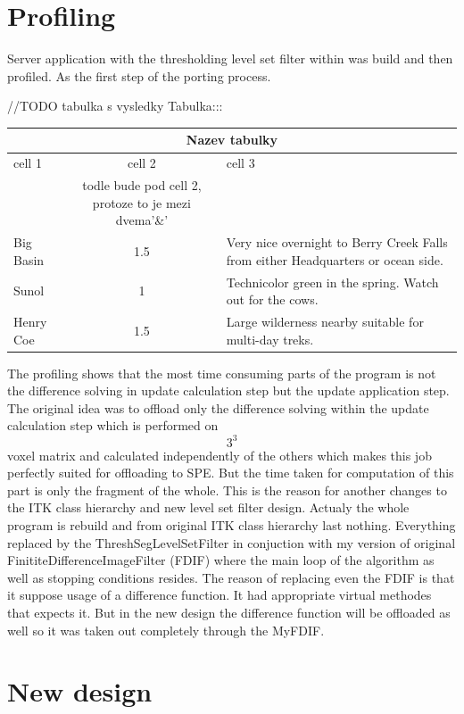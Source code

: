 \section{Profiling}

Server application with the thresholding level set filter within was build and then profiled. As the first step of the porting process.

//TODO tabulka s vysledky
Tabulka:::
\begin{center}
\begin{tabular}{|l|c|p{3.5in}|}
\hline
\multicolumn{3}{|c|}{Nazev tabulky}\\ 
\hline cell 1&cell 2&cell 3\\&todle bude pod cell 2, protoze to je mezi dvema'\&' &\\ 
\hline Big Basin&1.5&Very nice overnight to Berry Creek Falls from
either Headquarters or ocean side.\\ 
\hline Sunol&1&Technicolor green in the spring. Watch out for the cows.\\ 
\hline Henry Coe&1.5&Large wilderness nearby suitable for multi-day treks.\\ 
\hline
\end{tabular}
\end{center}

The profiling shows that the most time consuming parts of the program is not the difference solving in update calculation step but the update application step.
The original idea was to offload only the difference solving within the update calculation step which is performed on $$3^3$$ voxel matrix and calculated independently of the others which makes this job perfectly suited for offloading to SPE.
But the time taken for computation of this part is only the fragment of the whole.
This is the reason for another changes to the ITK class hierarchy and new level set filter design.
Actualy the whole program is rebuild and from original ITK class hierarchy last nothing.
Everything replaced by the ThreshSegLevelSetFilter in conjuction with my version of original FinititeDifferenceImageFilter (FDIF) where the main loop of the algorithm as well as stopping conditions resides.
The reason of replacing even the FDIF is that it suppose usage of a difference function.
It had appropriate virtual methodes that expects it.
But in the new design the difference function will be offloaded as well so it was taken out completely through the MyFDIF.

\section{New design}

